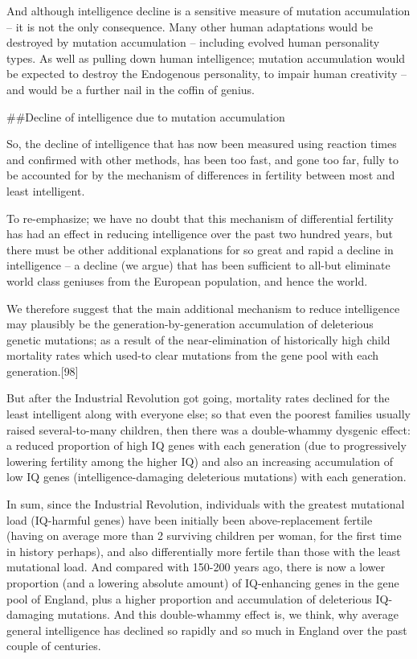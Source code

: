 \documentclass[
]{book}
\begin{document}
And although intelligence decline is a sensitive measure of mutation accumulation -- it is not the only consequence. Many other human adaptations would be destroyed by mutation accumulation -- including evolved human personality types. As well as pulling down human intelligence; mutation accumulation would be expected to destroy the Endogenous personality, to impair human creativity -- and would be a further nail in the coffin of genius.

\#\#Decline of intelligence due to mutation accumulation

So, the decline of intelligence that has now been measured using reaction times and confirmed with other methods, has been too fast, and gone too far, fully to be accounted for by the mechanism of differences in fertility between most and least intelligent.

To re-emphasize; we have no doubt that this mechanism of differential fertility has had an effect in reducing intelligence over the past two hundred years, but there must be other additional explanations for so great and rapid a decline in intelligence -- a decline (we argue) that has been sufficient to all-but eliminate world class geniuses from the European population, and hence the world.

We therefore suggest that the main additional mechanism to reduce intelligence may plausibly be the generation-by-generation accumulation of deleterious genetic mutations; as a result of the near-elimination of historically high child mortality rates which used-to clear mutations from the gene pool with each generation.{[}98{]}

But after the Industrial Revolution got going, mortality rates declined for the least intelligent along with everyone else; so that even the poorest families usually raised several-to-many children, then there was a double-whammy dysgenic effect: a reduced proportion of high IQ genes with each generation (due to progressively lowering fertility among the higher IQ) and also an increasing accumulation of low IQ genes (intelligence-damaging deleterious mutations) with each generation.

In sum, since the Industrial Revolution, individuals with the greatest mutational load (IQ-harmful genes) have been initially been above-replacement fertile (having on average more than 2 surviving children per woman, for the first time in history perhaps), and also differentially more fertile than those with the least mutational load. And compared with 150-200 years ago, there is now a lower proportion (and a lowering absolute amount) of IQ-enhancing genes in the gene pool of England, plus a higher proportion and accumulation of deleterious IQ-damaging mutations. And this double-whammy effect is, we think, why average general intelligence has declined so rapidly and so much in England over the past couple of centuries.
\end{document}
